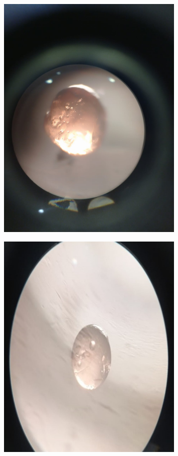 \begin{figure}[H]
	\centering
	\includegraphics[width=0.8\textwidth]{media/pish/image42}
	\caption*{}
\end{figure}


\begin{figure}[H]
	\centering
	\includegraphics[width=0.8\textwidth]{media/pish/image43}
	\caption*{}
\end{figure}


